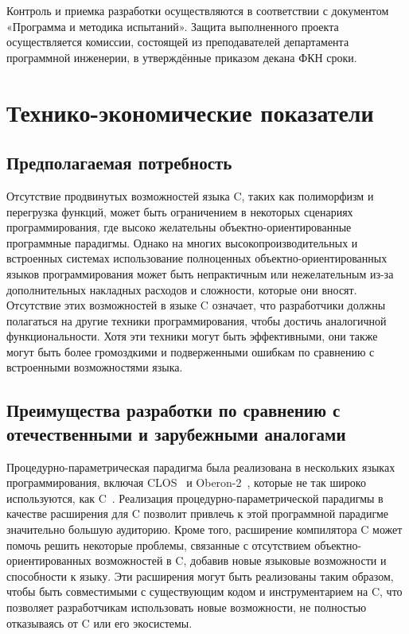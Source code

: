 Контроль и приемка разработки осуществляются в соответствии с документом «Программа и методика испытаний».
Защита выполненного проекта осуществляется комиссии, состоящей из преподавателей департамента программной инженерии,
в утверждённые приказом декана ФКН сроки.

\section{Технико-экономические показатели}

\subsection{Предполагаемая потребность}

Отсутствие продвинутых возможностей языка C, таких как полиморфизм и перегрузка функций, может быть ограничением в некоторых сценариях программирования, где высоко желательны объектно-ориентированные программные парадигмы.
Однако на многих высокопроизводительных и встроенных системах использование полноценных объектно-ориентированных языков программирования может быть непрактичным или нежелательным из-за дополнительных накладных расходов и сложности, которые они вносят.
Отсутствие этих возможностей в языке C означает, что разработчики должны полагаться на другие техники программирования, чтобы достичь аналогичной функциональности.
Хотя эти техники могут быть эффективными, они также могут быть более громоздкими и подверженными ошибкам по сравнению с встроенными возможностями языка.

\subsection{Преимущества разработки по сравнению с отечественными и зарубежными аналогами}

Процедурно-параметрическая парадигма была реализована в нескольких языках программирования, включая CLOS~\cite{demichiel1989overview} и Oberon-2~\cite{легалов2003процедурный}, которые не так широко используются, как C~\cite{bissyande2013popularity}.
Реализация процедурно-параметрической парадигмы в качестве расширения для C позволит привлечь к этой программной парадигме значительно большую аудиторию.
Кроме того, расширение компилятора C может помочь решить некоторые проблемы, связанные с отсутствием объектно-ориентированных возможностей в C, добавив новые языковые возможности и способности к языку.
Эти расширения могут быть реализованы таким образом, чтобы быть совместимыми с существующим кодом и инструментарием на C, что позволяет разработчикам использовать новые возможности, не полностью отказываясь от C или его экосистемы.
